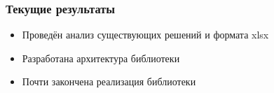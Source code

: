 \documentclass{beamer}
\begin{document}
\begin{frame}\frametitle{Текущие результаты}
\begin{itemize}
    \item Проведён анализ существующих решений и формата xlsx
    \item Разработана архитектура библиотеки
    \item Почти закончена реализация библиотеки
\end{itemize}
\end{frame}


\end{document}
